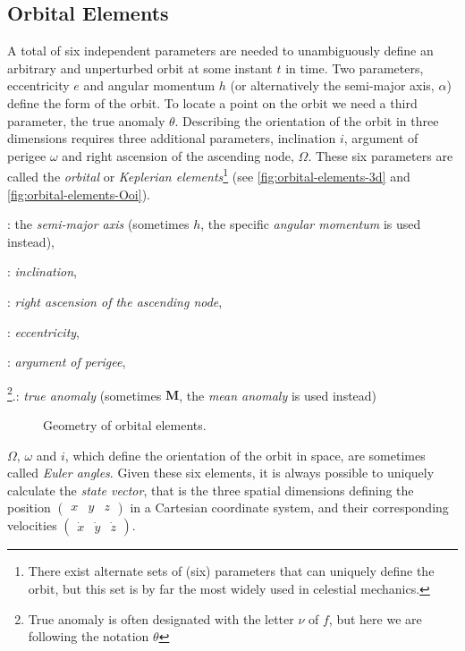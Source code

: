 \subsection{Orbital Elements}
\label{ssec:orbital-elements}

A total of six independent parameters are needed to unambiguously define an 
arbitrary and unperturbed orbit at some instant $t$ in time. Two parameters, 
eccentricity $e$ and angular momentum $h$ (or alternatively the semi-major axis, 
$\alpha$) define the form of the orbit. To locate a point on the orbit we need a 
third parameter, the true anomaly $\theta$. Describing the orientation of the 
orbit in three dimensions requires three additional parameters, inclination $i$, 
argument of perigee $\omega$ and right ascension of the ascending node, $\Omega$. 
These six parameters are called the \emph{orbital} or 
\emph{Keplerian elements}\footnote{There exist alternate sets of (six) parameters 
that can uniquely define the orbit, but this set is by far the most widely used 
in celestial mechanics.} (see \autoref{fig:orbital-elements-3d} and 
\autoref{fig:orbital-elements-Ooi}).
\begin{description}[labelindent=1cm]
  \item[$\alpha$]: the \emph{semi-major axis} (sometimes $h$, the specific 
    \emph{angular momentum} is used instead),
  \item[$i$]: \emph{inclination},
  \item[$\Omega$]: \emph{right ascension of the ascending node},
  \item[$e$]: \emph{eccentricity},
  \item[$\omega$]: \emph{argument of perigee},
  \item[$\theta$]\footnote{True anomaly is often designated with the letter 
    $\nu$ of $f$, but here we are following the notation $\theta$}.: 
    \emph{true anomaly} (sometimes $\bm{M}$, the \emph{mean anomaly} 
    is used instead)
\end{description}

\begin{figure}
  \centering
  
  \caption{Geometry of orbital elements.}
  \label{fig:orbital-elements-3d}
\end{figure}

$\Omega$, $\omega$ and $i$, which define the orientation of the orbit in space, 
are sometimes called \emph{Euler angles}. Given these six elements, it is always 
possible to uniquely calculate the \emph{state vector}, that is the three spatial 
dimensions defining the position $\begin{pmatrix}x&y&z\end{pmatrix}$ in a Cartesian 
coordinate system, and their corresponding velocities 
$\begin{pmatrix}\dot{x}&\dot{y}&\dot{z}\end{pmatrix}$.

